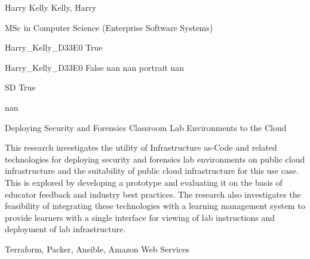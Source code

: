 \documentclass[twoside]{report}
\begin{document}
\begingroup{}\relax



\def\Key{Harry_Kelly_D33E0}

{Harry Kelly}
{Kelly, Harry}

{MSc in Computer Science (Enterprise Software Systems)}

{Harry_Kelly_D33E0}
{True}

{Harry_Kelly_D33E0}
{False}
{nan}
{nan}
{portrait}
{nan}

{SD}
{True}

{nan}

{Deploying Security and Forensics Classroom Lab Environments to the Cloud}

{This research investigates the utility of Infrastructure as-Code and related technologies for deploying security and forensics lab environments on public cloud infrastructure and the suitability of public cloud infrastructure for this use case. This is explored by developing a prototype and evaluating it on the basis of educator feedback and industry best practices. The research also investigates the feasibility of integrating these technologies with a learning management system to provide learners with a single interface for viewing of lab instructions and deployment of lab infrastructure.}

{Terraform, Packer, Ansible, Amazon Web Services}
\end{document}
